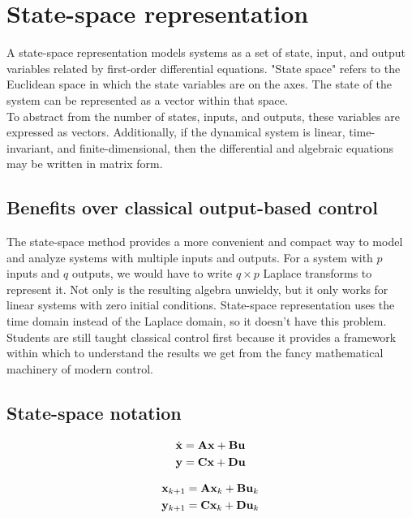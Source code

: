 \section{State-space representation}

A state-space representation models \glspl{system} as a set of \gls{state},
input, and output variables related by first-order differential equations.
"State space" refers to the Euclidean space in which the \gls{state} variables
are on the axes. The \gls{state} of the \gls{system} can be represented as a
vector within that space. \\

To abstract from the number of \glspl{state}, inputs, and outputs, these
variables are expressed as vectors. Additionally, if the dynamical \gls{system}
is linear, time-invariant, and finite-dimensional, then the differential and
algebraic equations may be written in matrix form.

\subsection{Benefits over classical output-based control}

The state-space method provides a more convenient and compact way to model and
analyze \glspl{system} with multiple inputs and outputs. For a system with $p$
inputs and $q$ outputs, we would have to write $q \times p$ Laplace transforms
to represent it. Not only is the resulting algebra unwieldy, but it only works
for linear systems with zero initial conditions. State-space representation uses
the time domain instead of the Laplace domain, so it doesn't have this problem.
\\

Students are still taught classical control first because it provides a
framework within which to understand the results we get from the fancy
mathematical machinery of modern control.

\subsection{State-space notation}

\begin{align}
  \dot{\mtx{x}} &= \mtx{A}\mtx{x} + \mtx{B}\mtx{u} \label{eq:ss_ctrl_x} \\
  \mtx{y} &= \mtx{C}\mtx{x} + \mtx{D}\mtx{u} \label{eq:ss_ctrl_y}
\end{align}

\begin{align}
  \mtx{x}_{k+1} &= \mtx{A}\mtx{x}_k + \mtx{B}\mtx{u}_k \label{eq:ssz_ctrl_x} \\
  \mtx{y}_{k+1} &= \mtx{C}\mtx{x}_k + \mtx{D}\mtx{u}_k \label{eq:ssz_ctrl_y}
\end{align}

